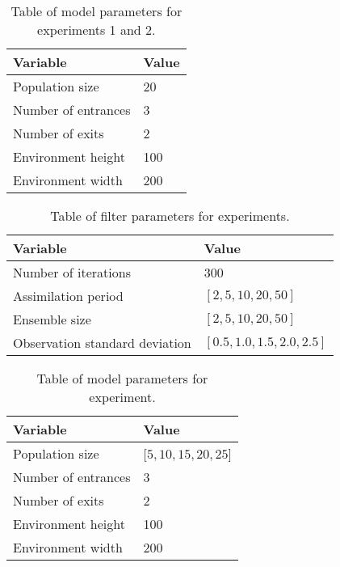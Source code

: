 \begin{table}[!htb]
    \centering
    \begin{tabular}{@{}ll@{}}
    \toprule
        Variable            & Value                 \\ \midrule
        Population size     & 20                    \\
        Number of entrances & 3                     \\
        Number of exits     & 2                     \\
        Environment height  & 100                   \\
        Environment width   & 200                   \\ \bottomrule
    \end{tabular}
    \caption{Table of model parameters for experiments
    1 and 2.}\label{tab:model_params_12}
\end{table}

\begin{table}[!htb]
    \centering
    \begin{tabular}{@{}ll@{}}
        \toprule
        Variable                       & Value                         \\ \midrule
        Number of iterations           & 300                           \\
        Assimilation period            & $[2, 5, 10, 20, 50]$          \\
        Ensemble size                  & $[2, 5, 10, 20, 50]$          \\
        Observation standard deviation & $[0.5, 1.0, 1.5, 2.0, 2.5]$   \\ \bottomrule
    \end{tabular}
    \caption{Table of filter parameters for experiments.}\label{tab:filter_params}
\end{table}

\begin{table}[!htb]
    \centering
    \begin{tabular}{@{}ll@{}}
    \toprule
        Variable            & Value                 \\ \midrule
        Population size     & $[5, 10, 15, 20, 25$] \\
        Number of entrances & 3                     \\
        Number of exits     & 2                     \\
        Environment height  & 100                   \\
        Environment width   & 200                   \\ \bottomrule
    \end{tabular}
    \caption{Table of model parameters for experiment.}\label{tab:model_params}
\end{table}

